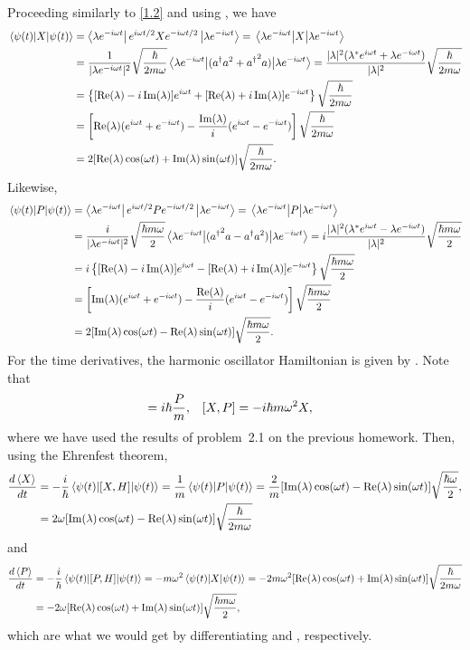 \begin{solution}
	Proceeding similarly to \ref{1.2} and using , we have
	\begin{align}
		\ev{X}{\psit} &= \blamt \eiwtf X \emiwtf \klamt
		= \ev{X}{\lamt} \notag \\
		&= \frac{1}{|\lamt|^2} \sqrt{\frac{\hbar}{2 m \omega}} \ev{(\ad a^2 + {\ad}^2 a)}{\lamt}
		= \frac{|\lam|^2 (\lam^* \eiwt + \lamt)}{|\lam|^2} \sqrt{\frac{\hbar}{2 m \omega}} \notag \\
		&= \left\{ [\Rel - i \Iml] \eiwt + [\Rel + i \Iml] \emiwt \right\} \sqrt{\frac{\hbar}{2 m \omega}} \notag \\
		&= \left[ \Rel (\eiwt + \emiwt) - \frac{\Iml}{i} (\eiwt - \emiwt) \right] \sqrt{\frac{\hbar}{2 m \omega}} \notag \\
		&= 2 [\Rel \coswt + \Iml \sinwt] \sqrt{\frac{\hbar}{2 m \omega}}. \label{evXt}
	\end{align}
	Likewise,
	\begin{align}
		\ev{P}{\psit} &= \blamt \eiwtf P \emiwtf \klamt
		= \ev{P}{\lamt} \notag \\
		&=  \frac{i}{|\lamt|^2} \sqrt{\frac{\hbar m \omega}{2}} \ev{({\ad}^2 a - \ad a^2)}{\lamt}
		= i \frac{|\lam|^2 (\lam^* \eiwt - \lamt)}{|\lam|^2} \sqrt{\frac{\hbar m \omega}{2}} \notag \\
		&= i \left\{ [\Rel - i \Iml] \eiwt - [\Rel + i \Iml] \emiwt \right\} \sqrt{\frac{\hbar m \omega}{2}} \notag \\
		&= \left[ \Iml (\eiwt + \emiwt) - \frac{\Rel}{i} (\eiwt - \emiwt) \right] \sqrt{\frac{\hbar m \omega}{2}} \notag \\
		&= 2 [\Iml \coswt - \Rel \sinwt] \sqrt{\frac{\hbar m \omega}{2}}. \label{evPt}
	\end{align}
	For the time derivatives, the harmonic oscillator Hamiltonian is given by .  Note that
	\begin{align*}
		[X, H] &= \ihb \frac{P}{m}, &
		[X, P] &= -\ihb m \omega^2 X,
	\end{align*}
	where we have used the results of problem~2.1 on the previous homework.  Then, using the Ehrenfest theorem,
	\begin{align*}
		\dv{\ev{X}}{t} &= -\frac{i}{\hbar} \ev{[X, H]}{\psit}
		= \frac{1}{m} \ev{P}{\psit}
		= \frac{2}{m} [\Iml \coswt - \Rel \sinwt] \sqrt{\frac{\hbar \omega}{2}}, \\
		&= 2 \omega [\Iml \coswt - \Rel \sinwt] \sqrt{\frac{\hbar}{2 m \omega}}
	\end{align*}
	and
	\begin{align*}
		\dv{\ev{P}}{t} &= -\frac{i}{\hbar} \ev{[P, H]}{\psit}
		= - m \omega^2 \ev{X}{\psit}
		= -2 m \omega^2 [\Rel \coswt + \Iml \sinwt] \sqrt{\frac{\hbar}{2 m \omega}} \\
		&= -2 \omega [\Rel \coswt + \Iml \sinwt] \sqrt{\frac{\hbar m \omega}{2}},
	\end{align*}
	which are what we would get by differentiating  and , respectively.
\end{solution}


